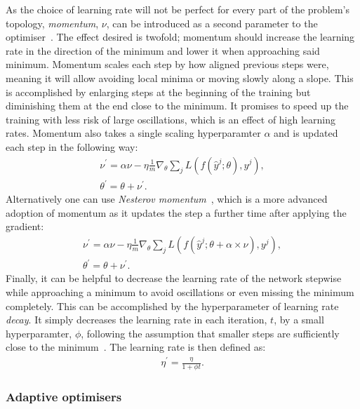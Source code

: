 As the choice of learning rate will not be perfect for every part of the problem's topology, \emph{momentum}, $\nu$, can be introduced as a second parameter to the optimiser~\cite{chollet2015keras}. The effect desired is twofold; momentum should increase the learning rate in the direction of the minimum and lower it when approaching said minimum. Momentum scales each step by how aligned previous steps were, meaning it will allow avoiding local minima or moving slowly along a slope. This is accomplished by enlarging steps at the beginning of the training but diminishing them at the end close to the minimum. It promises to speed up the training with less risk of large oscillations, which is an effect of high learning rates. Momentum also takes a single scaling hyperparamter $\alpha$ and is updated each step in the following way: 
%
\begin{align}
    \nu^{\prime} = \alpha \nu - \eta \frac{1}{m} \nabla_{\theta} \sum_j L(f(\hat{y}^j; \theta), y^j),\\
    \theta^{\prime} = \theta + \nu^{\prime}.
\end{align}
%
Alternatively one can use \emph{Nesterov momentum}~\cite{chollet2015keras}, which is a more advanced adoption of momentum as it updates the step a further time after applying the gradient: 
%
\begin{align}
    \nu^{\prime} = \alpha \nu - \eta \frac{1}{m} \nabla_{\theta} \sum_j L(f(\hat{y}^j; \theta + \alpha \times \nu), y^j),\\
    \theta^{\prime} = \theta + \nu^{\prime}.
\end{align}
%
Finally, it can be helpful to decrease the learning rate of the network stepwise while approaching a minimum to avoid oscillations or even missing the minimum completely. This can be accomplished by the hyperparameter of learning rate \emph{decay}. It simply decreases the learning rate in each iteration, $t$, by a small hyperparamter, $\phi$, following the assumption that smaller steps are sufficiently close to the minimum~\cite{chollet2015keras}. The learning rate is then defined as:
%
\begin{align}
    \eta^{\prime} = \frac{\eta}{1 + \phi t}.
\end{align}
%
\subsubsection{Adaptive optimisers}

